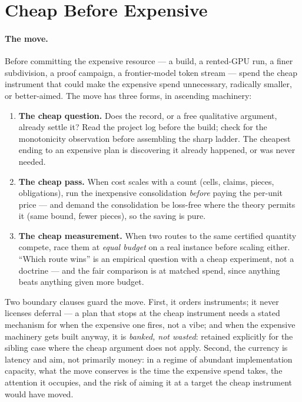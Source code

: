 \section{Cheap Before Expensive}
\label{sec:ckbk-cheap-first}

\paragraph{The move.} Before committing the expensive resource --- a
build, a rented-GPU run, a finer subdivision, a proof campaign, a
frontier-model token stream --- spend the cheap instrument that could
make the expensive spend unnecessary, radically smaller, or
better-aimed. The move has three forms, in ascending machinery:

\begin{enumerate}
\item \textbf{The cheap question.} Does the record, or a free
  qualitative argument, already settle it? Read the project log before
  the build; check for the monotonicity observation before assembling
  the sharp ladder. The cheapest ending to an expensive plan is
  discovering it already happened, or was never needed.
\item \textbf{The cheap pass.} When cost scales with a count (cells,
  claims, pieces, obligations), run the inexpensive consolidation
  \emph{before} paying the per-unit price --- and demand the
  consolidation be loss-free where the theory permits it (same bound,
  fewer pieces), so the saving is pure.
\item \textbf{The cheap measurement.} When two routes to the same
  certified quantity compete, race them at \emph{equal budget} on a
  real instance before scaling either. ``Which route wins'' is an
  empirical question with a cheap experiment, not a doctrine --- and
  the fair comparison is at matched spend, since anything beats
  anything given more budget.
\end{enumerate}

Two boundary clauses guard the move. First, it orders
instruments; it never licenses deferral --- a plan that stops at the
cheap instrument needs a stated mechanism for when the expensive one
fires, not a vibe; and when the expensive machinery gets built anyway,
it is \emph{banked, not wasted}: retained explicitly for the sibling
case where the cheap argument does not apply. Second, the currency is
latency and aim, not primarily money: in a regime of abundant
implementation capacity, what the move conserves is the time the
expensive spend takes, the attention it occupies, and the risk of
aiming it at a target the cheap instrument would have moved.

